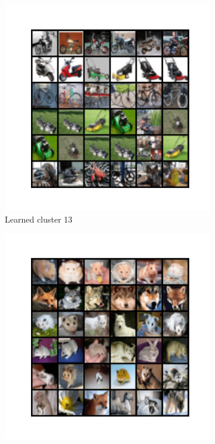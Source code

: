 \documentclass[10pt,twocolumn,letterpaper]{article}
\begin{document}
   \begin{figure}
     
     \begin{subfigure}{0.32\textwidth}
     \addtocounter{subfigure}{12}
       \includegraphics[width=\linewidth,trim={1cm 2cm 1cm 2cm},clip]{figures/experiments/cifar100_cluster/nearest_class12.png}
       \caption{Learned cluster 13}
     \end{subfigure}
     \hfill
     \begin{subfigure}{0.32\textwidth}
       \includegraphics[width=\linewidth,trim={1cm 2cm 1cm 2cm},clip]{figures/experiments/cifar100_cluster/nearest_class13.png}

\end{subfigure}
\end{figure}
\end{document}
